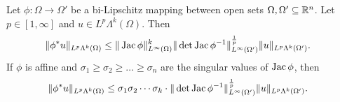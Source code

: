 \documentclass[10pt,a4paper]{article}
\begin{document}
\begin{proposition}\label{proposition:pullbackestimate}
    Let $\phi : \Omega \rightarrow \Omega'$ be a bi-Lipschitz mapping between open sets $\Omega, \Omega' \subseteq {\mathbb R}^{n}$.
    Let $p \in [1,\infty]$ and $u \in L^{p}\Lambda^{k}(\Omega)$. 
    Then 
    \begin{align}
        \| \phi^{\ast} u \|_{L^{p}\Lambda^{k}(\Omega)}
        &\leq 
        \| \operatorname{{\rm Jac}} \phi \|^{k}_{L^{\infty}(\Omega)}
        \| \det\operatorname{{\rm Jac}} \phi^{-1} \|^{\frac{1}{p}}_{L^{\infty}(\Omega')}
        \| u \|_{L^{p}\Lambda^{k}(\Omega')}
        .
    \end{align}
    If $\phi$ is affine and $\sigma_1 \geq \sigma_2 \geq \dots \geq \sigma_n$ are the singular values of $\operatorname{{\rm Jac}}\phi$, then 
    \begin{align}
        \| \phi^{\ast} u \|_{L^{p}\Lambda^{k}(\Omega)}
        &\leq 
        \sigma_1 \sigma_2 \cdots \sigma_k \cdot 
        \| \det\operatorname{{\rm Jac}} \phi^{-1} \|^{\frac{1}{p}}_{L^{\infty}(\Omega')}
        \| u \|_{L^{p}\Lambda^{k}(\Omega')}
        .
    \end{align}
\end{proposition}
\end{document}
